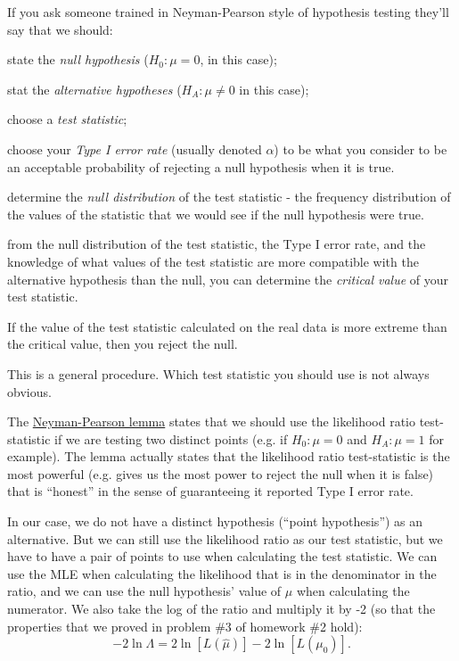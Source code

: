 \documentclass[11pt]{article}
\begin{document}
If you ask someone trained in  Neyman-Pearson style of hypothesis testing they'll say that we should:
\begin{compactenum}
	\item state the {\em null hypothesis} ($H_0: \mu = 0$, in this case);
	\item stat the {\em alternative hypotheses} ($H_A: \mu\neq0$ in this case);
	\item choose a {\em test statistic};
	\item choose your {\em Type I error rate} (usually denoted $\alpha$) to be what you consider to be an acceptable probability of rejecting a null hypothesis when it is true.
	\item determine the {\em null distribution} of the test statistic - the frequency distribution of the values of the statistic that we would see if the null hypothesis were true.
	\item from the null distribution of the test statistic, the Type I error rate, and the knowledge of what values of the test statistic are more compatible with the alternative hypothesis than the null, you can determine the {\em critical value} of your test statistic.
	\item If the value of the test statistic calculated on the real data is more extreme than the critical value, then you reject the null.
\end{compactenum}
This is a general procedure. 
Which test statistic you should use is not always obvious.

The \href{http://en.wikipedia.org/wiki/Neyman%E2%80%93Pearson_lemma}{Neyman-Pearson lemma}
states that we should use the likelihood ratio test-statistic if we are testing two distinct points (e.g. if $H_0: \mu=0$ and $H_A: \mu=1$ for example).
The lemma actually states that the likelihood ratio test-statistic is the most powerful (e.g. gives us the most power to reject the null when it is false) that is ``honest'' in the sense of guaranteeing it reported Type I error rate.

In our case, we do not have a distinct hypothesis (``point hypothesis'') as an alternative.  
But we can still use the likelihood ratio as our test statistic, but we have to have a pair of points to use when calculating the test statistic.
We can use the MLE when calculating the likelihood that is in the denominator in the ratio, and we can use the null hypothesis' value of $\mu$ when calculating the numerator.
We also take the log of the ratio and multiply it by -2 (so that the properties that we proved in problem \#3 of homework \#2 hold): 
$$ -2\ln\Lambda =  2 \ln[L(\hat{\mu})] - 2\ln[L(\mu_0)].$$
\end{document}

